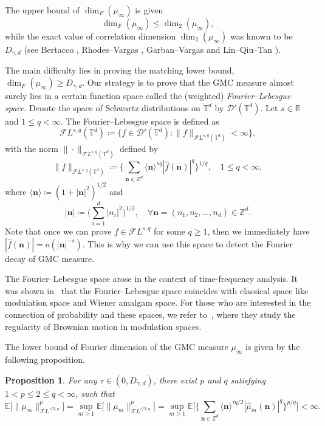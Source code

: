 \documentclass[12pt]{amsart}
\newtheorem{proposition}[theorem]{Proposition}
\theoremstyle{definition}
\theoremstyle{remark}
\newcommand{\R}{\mathbb{R}}
\newcommand{\Z}{\mathbb{Z}}
\newcommand{\E}{\mathbb{E}}
\newcommand{\T}{\mathbb{T}}
\numberwithin{equation}{section}
\begin{document}
The upper bound of $\dim_F(\mu_\infty)$ is given
\[
\dim_F(\mu_\infty)\le \dim_2(\mu_\infty),
\]
while the exact value of correlation dimension $\dim_2(\mu_\infty)$ was known to be $D_{\gamma,d}$ (see Bertacco \cite[Theorem~3.1 and Formula~(3.2)]{Ber23}, Rhodes--Vargas \cite[Section~4.2]{RV14}, Garban--Vargas \cite[Remark~2]{GV23} and Lin--Qiu--Tan \cite[Lemma~3.6]{LQT25}). 

The main difficulty lies in proving the matching lower bound, $\dim_F(\mu_\infty) \ge D_{\gamma,d}$. Our strategy is to prove that the GMC measure almost surely lies in a certain function space called the (weighted) \textit{Fourier--Lebesgue space}.  Denote the space of Schwartz distributions on $\T^d$ by $\mathcal{D}'(\T^d)$. Let $s\in \R$ and $1\le q<\infty$. The Fourier--Lebesgue space is defined as
\[
\mathcal{F}L^{s,q}(\T^d)\coloneq \Big\{f\in \mathcal{D}'(\T^d):\|f\|_{\mathcal{F}L^{s,q}(\T^d)}<\infty\Big\}, 
\]
with the norm $\|\cdot\|_{\mathcal{F}L^{s,q}(\T^d)}$ defined by
\begin{equation}\label{eq:def-FLnorm}
\|f\|_{\mathcal{F}L^{s,q}(\T^d)}\coloneq \Big\{\sum_{\boldsymbol{n}\in \Z^d} \langle\boldsymbol{n}\rangle^{s q}|\widehat{f}(\boldsymbol{n})|^q\Big\}^{1/q},\quad 1\leq q<\infty,
\end{equation}
where \(\langle\boldsymbol{n}\rangle\coloneq (1+|\boldsymbol{n}|^2)^{1/2}\) and
\[
|\boldsymbol{n}|\coloneq \Big(\sum_{i=1}^d |n_i|^2\Big)^{1/2},\quad \forall \boldsymbol{n}=(n_1,n_2,\ldots,n_d)\in \Z^d.
\]
 Note that once we can prove $f\in \mathcal{F}L^{s,q}$ for some $q\ge 1$, then we immediately have $|\widehat{f}(\boldsymbol{n})|=o(|\boldsymbol{n}|^{-s})$. This is why we can use this space to detect the Fourier decay of GMC measure. 

The Fourier--Lebesgue space arose in the context of time-frequency analysis. It was shown in~\cite[Proposition~2.1 and Remark 4.2]{RSTT11} that the Fourier--Lebesgue space coincides with classical space like modulation space and Wiener amalgam space. For those who are interested in the connection of probability and these spaces, we refer to~\cite{BO11}, where they study the regularity of Brownian motion in modulation spaces.

The lower bound of Fourier dimension of the GMC measure \(\mu_\infty\) is given by the following proposition.
\begin{proposition}\label{prop:uniform-boundedness-Fourier-Lebesgue-norm}
For any $\tau\in (0,D_{\gamma,d})$, there exist $p$ and $q$ satisfying $1<p\le 2\le q<\infty$, such that
\[
\mathbb{E}\big[\|\mu_\infty\|_{\mathcal{F}L^{\tau/2,q}}^p\big]=\sup_{m\ge 1}\E\big[\|\mu_m\|_{\mathcal{F}L^{\tau/2,q}}^p\big]=\sup_{m\ge 1}\E\Big[\Big\{\sum_{\boldsymbol{n}\in \Z^d} \langle\boldsymbol{n}\rangle^{\tau q/2}|\widehat{\mu}_m(\boldsymbol{n})|^q\Big\}^{p/q}\Big]<\infty.
\]
\end{proposition}
\end{document}
